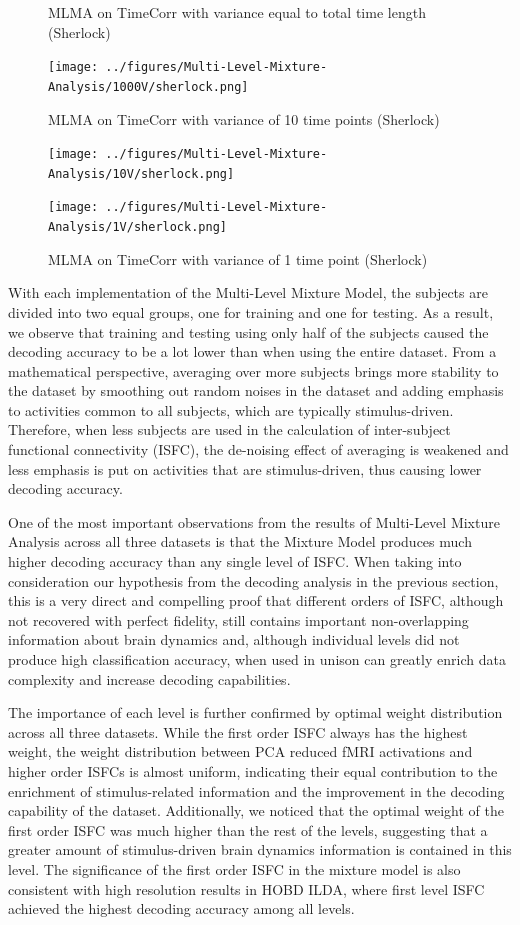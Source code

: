 \documentclass[11pt]{article}
\begin{document}
\begin{figure}[!htb]
\caption{MLMA on TimeCorr with variance equal to total time length (Sherlock)}
\centering
\texttt{[image: ../figures/Multi-Level-Mixture-Analysis/1000V/sherlock.png]}
\label{fig:sherlockMM1000}
\caption{MLMA on TimeCorr with variance of 10 time points (Sherlock)}
\centering
\texttt{[image: ../figures/Multi-Level-Mixture-Analysis/10V/sherlock.png]}
\label{fig:sherlockMM10}
\caption{MLMA on TimeCorr with variance of 1 time point (Sherlock)}
\centering
\texttt{[image: ../figures/Multi-Level-Mixture-Analysis/1V/sherlock.png]}
\label{fig:sherlockMM1}
\end{figure}

With each implementation of the Multi-Level Mixture Model, the subjects are divided into two equal groups, one for training and one for testing. As a result, we observe that training and testing using only half of the subjects caused the decoding accuracy to be a lot lower than when using the entire dataset. From a mathematical perspective, averaging over more subjects brings more stability to the dataset by smoothing out random noises in the dataset and adding emphasis to activities common to all subjects, which are typically stimulus-driven. Therefore, when less subjects are used in the calculation of inter-subject functional connectivity (ISFC), the de-noising effect of averaging is weakened and less emphasis is put on activities that are stimulus-driven, thus causing lower decoding accuracy.

One of the most important observations from the results of Multi-Level Mixture Analysis across all three datasets is that the Mixture Model produces much higher decoding accuracy than any single level of ISFC. When taking into consideration our hypothesis from the decoding analysis in the previous section, this is a very direct and compelling proof that different orders of ISFC, although not recovered with perfect fidelity, still contains important non-overlapping information about brain dynamics and, although individual levels did not produce high classification accuracy, when used in unison can greatly enrich data complexity and increase decoding capabilities.

The importance of each level is further confirmed by optimal weight distribution across all three datasets. While the first order ISFC always has the highest weight, the weight distribution between PCA reduced fMRI activations and higher order ISFCs is almost uniform, indicating their equal contribution to the enrichment of stimulus-related information and the improvement in the decoding capability of the dataset. Additionally, we noticed that the optimal weight of the first order ISFC was much higher than the rest of the levels, suggesting that a greater amount of stimulus-driven brain dynamics information is contained in this level. The significance of the first order ISFC in the mixture model is also consistent with high resolution results in HOBD ILDA, where first level ISFC achieved the highest decoding accuracy among all levels.
\end{document}
